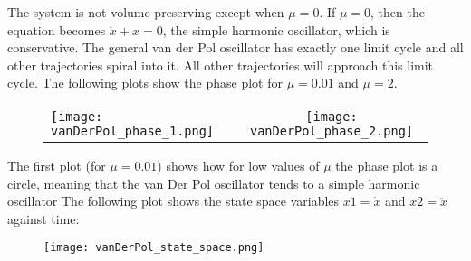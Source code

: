 \documentclass[10pt]{beamer}
\begin{document}
\begin{frame}
The system is not volume-preserving except when $\mu = 0$\cite{cornell}. If $\mu = 0$, then the equation becomes $\ddot{x} + x = 0$, the simple harmonic oscillator, which is conservative. 
\linebreak
The general van der Pol oscillator has exactly one limit cycle and all other trajectories spiral into it. All other trajectories will approach this limit cycle.
\linebreak
The following plots show the phase plot for $\mu = 0.01$ and $\mu = 2$.
\begin{figure}[h]
	\begin{tabular} {l c}
	\texttt{[image: vanDerPol\_phase\_1.png]} &
	\texttt{[image: vanDerPol\_phase\_2.png]} 
	\end{tabular}
\end{figure}
\label{fig2}

\end{frame}
\pagebreak
\begin{frame}
The first plot (for $\mu = 0.01$) shows how for low values of $\mu$ the phase plot is a circle, meaning that
the van Der Pol oscillator tends to a simple harmonic oscillator
\linebreak
\linebreak
The following plot shows the state space variables $x1 = \dot{x}$ and $x2 = \ddot{x}$ against time:

 \begin{figure}[h]
	\texttt{[image: vanDerPol\_state\_space.png]} 
\end{figure}
\end{frame}

{}

\end{document}
